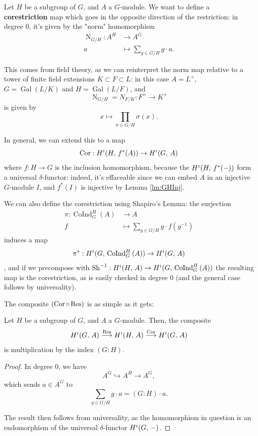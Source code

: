 \documentclass[a4paper, oneside]{memoir}
\begin{document}
Let $H$ be a subgroup of $G$, and $A$ a $G$-module. We want to define a \textbf{corestriction} map which goes in the opposite direction of the restriction: in degree $0$, it's given by the "norm" homomorphism
\begin{align*}
    \operatorname{N}_{G/H}: A^H & \longrightarrow A^G                   \\
    a                           & \longmapsto \sum_{g\in G/H} g\cdot a.
\end{align*}
\begin{remark}
    This comes from field theory, as we can reinterpret the norm map relative to a tower of finite field extensions $K\subset F\subset L$: in this case $A=L^\times$, $G=\operatorname{Gal}{(L/K)}$ and $H=\operatorname{Gal}{(L/F)}$, and $$\operatorname{N}_{G/H}=N_{F/K}: F^\times\to K^\times$$ is given by $$x\mapsto\prod_{\sigma\in G/H} \sigma(x).$$
\end{remark}

\noindent In general, we can extend this to a map
\[
    \operatorname{Cor}: H^{i}( H, \, f^*(A) )\to H^{i}( G, \, A )
\]
where $f: H\to G$ is the inclusion homomorphism, because the $H^{i}( H, \, f^*(-) )$ form a universal $\delta$-functor: indeed, it's effaceable since we can embed $A$ in an injective $G$-module $I$, and $f^*(I)$ is injective by Lemma \ref{lm:GHInj}.

\begin{remark}\label{rm:Cor}
    We can also define the corestriction using Shapiro's Lemma: the surjection
    \begin{align*}
        \pi: \operatorname{CoInd}_G^H{(A)} & \to A                                      \\
        f                                  & \mapsto \sum_{g\in G /H}{g\cdot f(g^{-1})}
    \end{align*}
    induces a map
    \[
        \pi^*:H^{i}( G, \, \operatorname{CoInd}_G^H{(A)} )\to H^{i}( G, \, A )
    \],
    and if we precompose with $\operatorname{Sh}^{-1}: H^{i}( H, \, A )\to H^{i}( G, \, \operatorname{CoInd}_G^H{(A)} )$ the resulting map is the corestriction, as is easily checked in degree $0$ (and the general case follows by universality).
\end{remark}

The composite $(\operatorname{Cor}\circ\operatorname{Res})$ is as simple as it gets:

\begin{theorem}\label{thm:CorRes}
    Let $H$ be a subgroup of $G$, and $A$ a $G$-module. Then,  the composite
    \[
        H^{i}( G, \, A )\overset{\operatorname{Res}}{\longrightarrow}H^{i}( H, \, A )\overset{\operatorname{Cor}}{\longrightarrow}H^{i}( G, \, A )
    \]
    is multiplication by the index $(G:H)$.
\end{theorem}
\begin{proof}
    In degree $0$, we have
    \[
        A^G\hookrightarrow A^H\to A^G,
    \]
    which sends $a\in A^G$ to $$\sum_{g\in G/H} g\cdot a = (G:H)\cdot a.$$

    The result then follows from universality, as the homomorphism in question is an endomorphism of the universal $\delta$-functor $H^{i}( G, \, - )$.
\end{proof}
\end{document}
